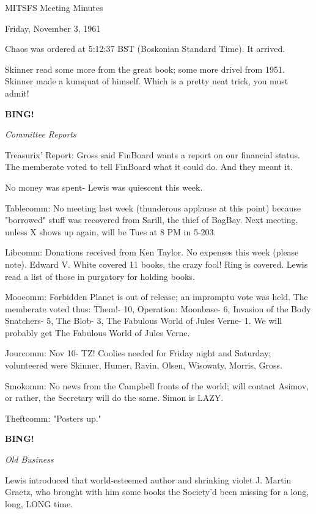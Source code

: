 \documentclass[12pt]{article}
\newcommand{\bing}{{\bf BING!} }
\newcommand{\goto}[1]{\bing \vskip 12pt \centerline{{\em{#1}}}}
\begin{document}
\begin{center}

MITSFS Meeting Minutes

Friday, November 3, 1961

\end{center}
 
\vspace{12pt}

\setlength{\parskip}{6pt}

\noindent
Chaos was ordered at 5:12:37 BST (Boskonian Standard Time). It arrived.

Skinner read some more from the great book; some more drivel from 1951. Skinner made a kumquat of himself. Which is a pretty neat trick, you must admit!

\goto{Committee Reports}

Treasurix' Report: Gross said FinBoard wants a report on our financial status. The memberate voted to tell FinBoard what it could do. And they meant it.

No money was spent- Lewis was quiescent this week.

Tablecomm: No meeting last week (thunderous applause at this point) because "borrowed" stuff was recovered from Sarill, the thief of BagBay. Next meeting, unless X shows up again, will be Tues at 8 PM in 5-203.

Libcomm: Donations received from Ken Taylor. No expenses this week (please note). Edward V. White covered 11 books, the crazy fool! Ring is covered. Lewis read a list of those in purgatory for holding books.

Moocomm: Forbidden Planet is out of release; an impromptu vote was held. The memberate voted thus: Them!- 10, Operation: Moonbase- 6, Invasion of the Body Snatchers- 5, The Blob- 3, The Fabulous World of Jules Verne- 1. We will probably get The Fabulous World of Jules Verne.

Jourcomm: Nov 10- TZ! Coolies needed for Friday night and Saturday; volunteered were Skinner, Humer, Ravin, Olsen, Wisowaty, Morris, Gross.

Smokomm: No news from the Campbell fronts of the world; will contact Asimov, or rather, the Secretary will do the same. Simon is LAZY.

Theftcomm: "Posters up."

\goto{Old Business}

Lewis introduced that world-esteemed author and shrinking violet J. Martin Graetz, who brought with him some books the Society'd been missing for a long, long, LONG time.
\end{document}
